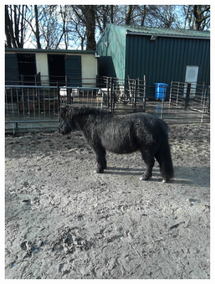 \documentclass{l4proj}
\begin{document}
\begin{figure}[ht]
\begin{subfigure}[h!]{0.18\textwidth}
    \includegraphics[width=\textwidth, trim={0cm 6cm 0cm 6cm}, clip]{images/dataset/pony/rgb.png}

\end{subfigure}
\end{figure}
\end{document}
